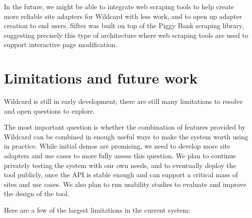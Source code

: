 \documentclass[english,submission]{programming}
\begin{document}
In the future, we might be able to integrate web scraping tools to help
create more reliable site adapters for Wildcard with less work, and to
open up adapter creation to end users. Sifter was built on top of the
Piggy Bank scraping library, suggesting precisely this type of
architecture where web scraping tools are used to support interactive
page modification.

\hypertarget{limitations-and-future-work}{%
\section{Limitations and future
work}\label{limitations-and-future-work}}

Wildcard is still in early development; there are still many limitations
to resolve and open questions to explore.

The most important question is whether the combination of features
provided by Wildcard can be combined in enough useful ways to make the
system worth using in practice. While initial demos are promising, we
need to develop more site adapters and use cases to more fully assess
this question. We plan to continue privately testing the system with our
own needs, and to eventually deploy the tool publicly, once the API is
stable enough and can support a critical mass of sites and use cases. We
also plan to run usability studies to evaluate and improve the design of
the tool.

Here are a few of the largest limitations in the current system:
\end{document}
